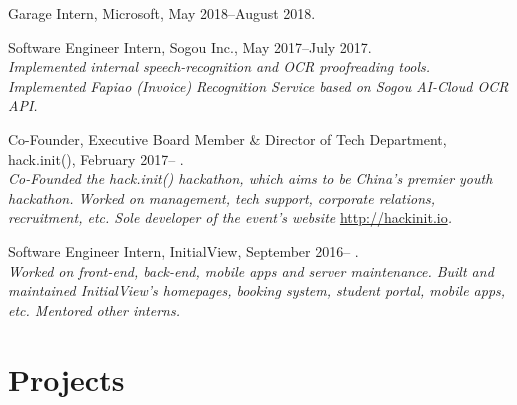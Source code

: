 \documentclass[letterpaper]{article}
\renewenvironment{itemize}{
  \begin{list}{}{
    \setlength{\leftmargin}{1.5em}
  }
}{
  \end{list}
}
\begin{document}
\begin{itemize}
  \item Garage Intern, Microsoft, May 2018--August 2018.

  \item Software Engineer Intern, Sogou Inc., May 2017--July 2017.\\
  \emph{Implemented internal speech-recognition and OCR proofreading tools. Implemented Fapiao (Invoice) Recognition Service based on Sogou AI-Cloud OCR API.}

  \item Co-Founder, Executive Board Member \& Director of Tech Department, hack.init(), February 2017-- .\\
  \emph{Co-Founded the hack.init() hackathon, which aims to be China's premier youth hackathon. Worked on management, tech support, corporate relations, recruitment, etc. Sole developer of the event's website }\url{http://hackinit.io}\emph{.}

  \item Software Engineer Intern, InitialView, September 2016-- .\\
  \emph{Worked on front-end, back-end, mobile apps and server maintenance. Built and maintained InitialView's homepages, booking system, student portal, mobile apps, etc. Mentored other interns.}
\end{itemize}


\section*{Projects}
\end{document}
